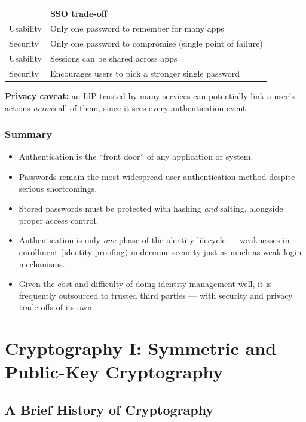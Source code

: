 \documentclass[12pt, a4paper]{article}
\begin{document}
\begin{center}
\begin{tabular}{@{}ll@{}}
\toprule
 & \textbf{SSO trade-off} \\
\midrule
Usability & Only one password to remember for many apps \\
Security & Only one password to compromise (single point of failure) \\
Usability & Sessions can be shared across apps \\
Security & Encourages users to pick a stronger single password \\
\bottomrule
\end{tabular}
\end{center}

\textcolor{red!70!black}{\textbf{Privacy caveat:}} an IdP trusted by many services can potentially link a user's actions \emph{across} all of them, since it sees every authentication event.

\subsubsection{Summary}
\begin{itemize}
    \item Authentication is the ``front door'' of any application or system.
    \item Passwords remain the most widespread user-authentication method despite serious shortcomings.
    \item Stored passwords must be protected with hashing \emph{and} salting, alongside proper access control.
    \item Authentication is only \emph{one} phase of the identity lifecycle — weaknesses in enrollment (identity proofing) undermine security just as much as weak login mechanisms.
    \item Given the cost and difficulty of doing identity management well, it is frequently outsourced to trusted third parties — with security and privacy trade-offs of its own.
\end{itemize}



\section{Cryptography I: Symmetric and Public-Key Cryptography}

\subsection{A Brief History of Cryptography}
\end{document}
